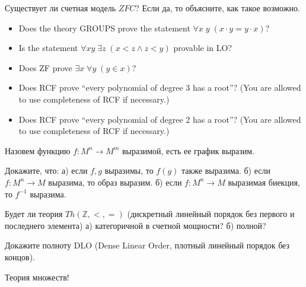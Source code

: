 \setcounter{curtask}{1}


\begin{task}
    Существует ли счетная модель $ZFC$? Если да, то объясните, как такое возможно.
\end{task}

\begin{task}
    \begin{itemize}
        \item Does the theory GROUPS prove the statement $\forall x\; y\;
        	(x\cdot y = y \cdot x)$?
        \item Is the statement $\forall xy\; \exists z\; (x<z \wedge z<y)$ provable
	    in LO?
    	\item Does ZF prove $\exists x \; \forall y\; (y\in x)$?
    	\item Does RCF prove ``every polynomial of degree 3 has a root''?
			(You are allowed to use completeness of RCF if necessary.)
		 \item Does RCF prove ``every polynomial of degree 2 has a root''? 
			 (You are allowed to use completeness of RCF if necessary.)
    \end{itemize}
\end{task}

Назовем функцию $f:M^{n} \to M^{m}$ выразимой, есть ее график выразим.

\begin{task}
	Докажите, что:
    а) если $f, g$ выразимы, то $f(g)$ также выразима.
    б) если $f:M^{n} \to M$ выразима, то образ выразим.
    б) если $f:M^{n} \to M$ выразимая биекция, то $f^{-1}$ выразима.
\end{task}

\begin{task}
    Будет ли теория $Th(\mathbb{Z}, <, =)$ (дискретный линейный порядок
    без первого и последнего элемента)
    а) категоричной в счетной мощности?
    б) полной?
\end{task}

\begin{task}
    Докажите полноту DLO (Dense Linear Order, плотный линейный порядок без концов).
\end{task}

\breakline

Теория множеств!